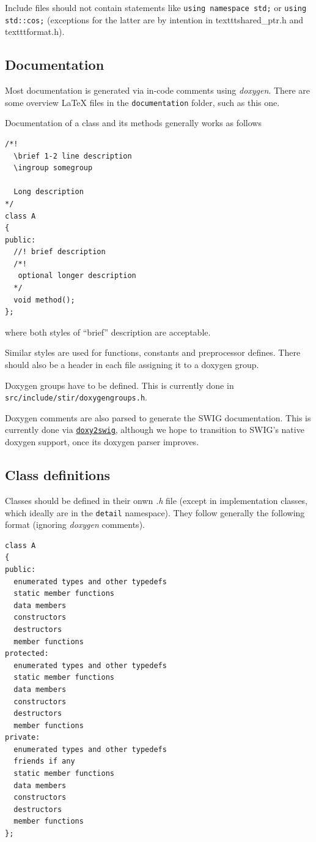 \documentclass{article}
\def\R2Lurl#1#2{\mbox{\href{#1}{\tt #2}}}
\begin{document}
Include files should not contain statements like \texttt{using namespace std;} or
\texttt{using std::cos;} (exceptions for the latter are by intention in texttt{shared\_ptr.h}
and texttt{format.h}).

\subsection{
Documentation}
Most documentation is generated via in-code comments using \textit{doxygen}. There are some overview \LaTeX
files in the \texttt{documentation} folder, such as this one.

Documentation of a class and its methods generally works as follows
\begin{verbatim}
/*!
  \brief 1-2 line description
  \ingroup somegroup

  Long description
*/
class A
{
public: 
  //! brief description
  /*!
   optional longer description
  */
  void method();
};
\end{verbatim}
where both styles of ``brief'' description are acceptable.

Similar styles are used for functions, constants and preprocessor defines. There should also be
a header in each file assigning it to a doxygen group.

Doxygen groups have to be defined. This is currently done in \texttt{src/include/stir/doxygengroups.h}.

Doxygen comments are also parsed to generate the SWIG documentation. This is currently done via
\R2Lurl{https://github.com/m7thon/doxy2swig}{doxy2swig}, although we hope to transition to SWIG's
native doxygen support, once its doxygen parser improves.

\subsection{
Class definitions}

Classes should be defined in their onwn \textit{.h} file (except in implementation classes, which ideally
are in the \texttt{detail} namespace). They follow generally the following format (ignoring \textit{doxygen} 
comments).

\begin{verbatim}
class A
{
public: 
  enumerated types and other typedefs 
  static member functions  
  data members  
  constructors 
  destructors 
  member functions
protected: 
  enumerated types and other typedefs 
  static member functions 
  data members 
  constructors 
  destructors 
  member functions
private: 
  enumerated types and other typedefs 
  friends if any 
  static member functions 
  data members 
  constructors 
  destructors 
  member functions
};
\end{verbatim}
\end{document}
